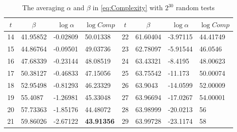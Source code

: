 \begin{table}[htbp]
  \centering
  \caption{The averaging $\alpha$ and $\beta$ in \eqref{eq:Complexity} with $2^{30}$ random tests}\label{tab:AlphaAndBeta}
    \begin{tabular}{|l|l|l|l|l|l|l|l|}
    \hline
    \multicolumn{1}{|c|}{$t$} & \multicolumn{1}{c|}{$\beta$} & \multicolumn{1}{c|}{$\log\alpha$} & \multicolumn{1}{c|}{$\log Comp$} & \multicolumn{1}{c|}{$t$} & \multicolumn{1}{c|}{$\beta$} & \multicolumn{1}{c|}{$\log\alpha$} & \multicolumn{1}{c|}{$\log Comp$} \\
    \hline

    14    & 41.95852 & -0.02809 & 50.01338 & 22    & 61.60404 & -3.97115 & 44.41749 \\
    \hline
    15    & 44.86764 & -0.09501 & 49.03736 & 23    & 62.78097 & -5.91544 & 46.0546 \\
    \hline
    16    & 47.68339 & -0.23144 & 48.08519 & 24    & 63.43321 & -8.4195 & 48.00623 \\
    \hline
    17    & 50.38127 & -0.46833 & 47.15056 & 25    & 63.75542 & -11.173 & 50.00074 \\
    \hline
    18    & 52.95498 & -0.81293 & 46.23329 & 26    & 63.9043 & -14.0599 & 52.00009 \\
    \hline
    19    & 55.4087 & -1.26981 & 45.33048 & 27    & 63.96694 & -17.0267 & 54.00001 \\
    \hline
    20    & 57.73363 & -1.85176 & 44.48072 & 28    & 63.98999 & -20.0213 & 56 \\
    \hline
    21    & 59.86026 & -2.67122 & \textbf{43.91356} & 29    & 63.99728 & -23.1174 & 58 \\
    \hline

    \end{tabular}%
\end{table}%


